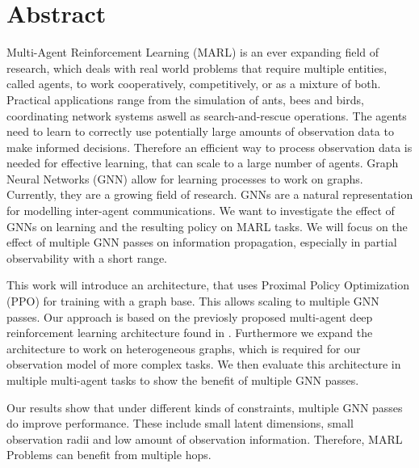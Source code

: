 
\chapter*{Abstract}

Multi-Agent Reinforcement Learning (MARL) is an ever expanding field of research, which deals with real world problems that require multiple entities, called agents, to work cooperatively, competitively, or as a mixture of both. Practical applications range from the simulation of ants, bees and birds, coordinating network systems aswell as search-and-rescue operations. The agents need to learn to correctly use potentially large amounts of observation data to make informed decisions. Therefore an efficient way to process observation data is needed for effective learning, that can scale to a large number of agents. Graph Neural Networks (GNN) allow for learning processes to work on graphs. Currently, they are a growing field of research. GNNs are a natural representation for modelling inter-agent communications. We want to investigate the effect of GNNs on learning and the resulting policy on MARL tasks. We will focus on the effect of multiple GNN passes on information propagation, especially in partial observability with a short range.\par

This work will introduce an architecture, that uses Proximal Policy Optimization (PPO) for training with a graph base. This allows scaling to multiple GNN passes. Our approach is based on the previosly proposed multi-agent deep reinforcement learning architecture found in \citet{RobinRuede2021}. Furthermore we expand the architecture to work on heterogeneous graphs, which is required for our observation model of more complex tasks. We then evaluate this architecture in multiple multi-agent tasks to show the benefit of multiple GNN passes. 
\par

Our results show that under different kinds of constraints, multiple GNN passes do improve performance. These include small latent dimensions, small observation radii and low amount of observation information. Therefore, MARL Problems can benefit from multiple hops.
